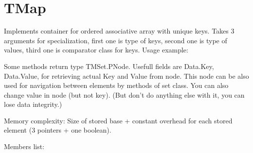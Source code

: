 \chapter{TMap}

Implements container for ordered associative array with unique keys.
Takes 3 arguments for specialization, first one is type of keys, second one is type of values, third
one is comparator class for keys.
Usage example:



Some methods return type TMSet.PNode. Usefull fields are Data.Key, Data.Value, for retrieving
actual Key and Value from node. This node can be also used for navigation between elements by methods of set class.
You can also change value in node (but not key).
(But don't do anything else with it, you can lose data integrity.)

Memory complexity:
Size of stored base + constant overhead for each stored element (3 pointers + one boolean).

Members list:

